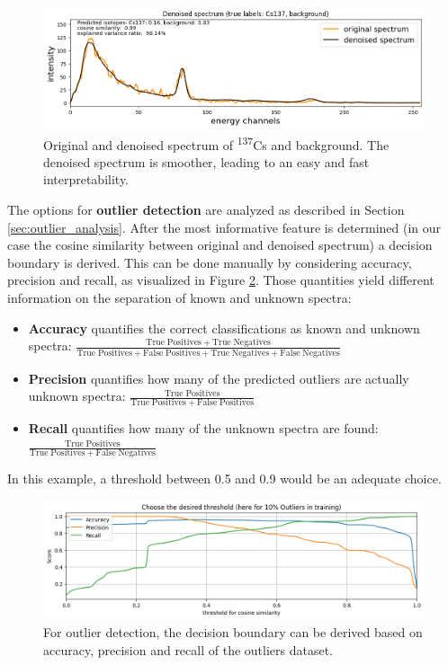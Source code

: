 \documentclass[preprint, 12pt, a4paper]{elsarticle}
\begin{document}
\begin{figure}
\includegraphics[width=\textwidth]{Denoised_Cs137.png}
\caption{Original and denoised spectrum of \textsuperscript{137}Cs and background. The denoised spectrum is smoother, leading to an easy and fast interpretability.}
\label{fig:denoised_spectrum}
\end{figure}

The options for \textbf{outlier detection} are analyzed as described in Section \ref{sec:outlier_analysis}. After the most informative feature is determined (in our case the cosine similarity between original and denoised spectrum) a decision boundary is derived. This can be done manually by considering accuracy, precision and recall, as visualized in Figure \ref{fig:outlier}. Those quantities yield different information on the separation of known and unknown spectra:
\begin{itemize}
\item \textbf{Accuracy} quantifies the correct classifications as known and unknown spectra: $\frac{\mathrm{True\;Positives + True\;Negatives}}{\mathrm{True\;Positives + False\;Positives + True\;Negatives + False\;Negatives}}$
\item \textbf{Precision} quantifies how many of the predicted outliers are actually unknown spectra: $\frac{\mathrm{True\;Positives}}{\mathrm{True\;Positives + False\;Positives}}$
\item \textbf{Recall} quantifies how many of the unknown spectra are found: \\$\frac{\mathrm{True\;Positives}}{\mathrm{True\;Positives + False\;Negatives}}$
\end{itemize}
In this example, a threshold between 0.5 and 0.9 would be an adequate choice. 

\begin{figure}
\includegraphics[width=\textwidth]{outlier_accuracy_precision_recall.png}
\caption{For outlier detection, the decision boundary can be derived based on accuracy, precision and recall of the outliers dataset. }
\label{fig:outlier}
\end{figure}
\end{document}
